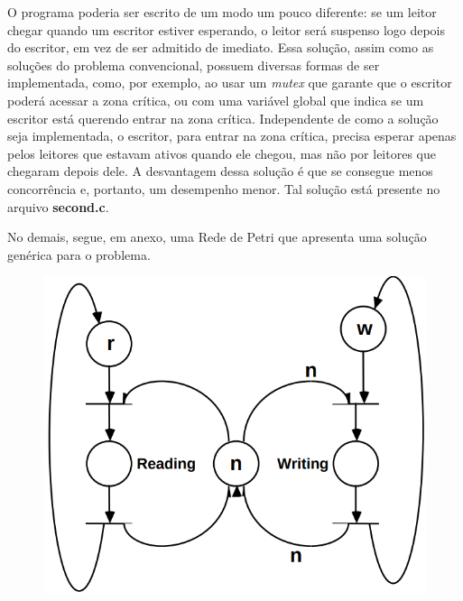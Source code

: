 	O programa poderia ser escrito de um modo um pouco diferente: se um leitor chegar quando um escritor estiver esperando, o leitor será suspenso logo depois do escritor, em vez de ser admitido de imediato. Essa solução, assim como as soluções do problema convencional, possuem diversas formas de ser implementada, como, por exemplo, ao usar um \textit{mutex} que garante que o escritor poderá acessar a zona crítica, ou com uma variável global que indica se um escritor está querendo entrar na zona crítica. Independente de como a solução seja implementada, o escritor, para entrar na zona crítica, precisa esperar apenas pelos leitores que estavam ativos quando ele chegou, mas não por leitores que chegaram depois dele. A desvantagem dessa solução é que se consegue menos concorrência e, portanto, um desempenho menor. Tal solução está presente no arquivo \textbf{second.c}.
	
	No demais, segue, em anexo, uma Rede de Petri que apresenta uma solução genérica para o problema.
	
	\begin{figure}[H]
		\includegraphics[scale=.7]{pictures/picture_01}
	\end{figure}